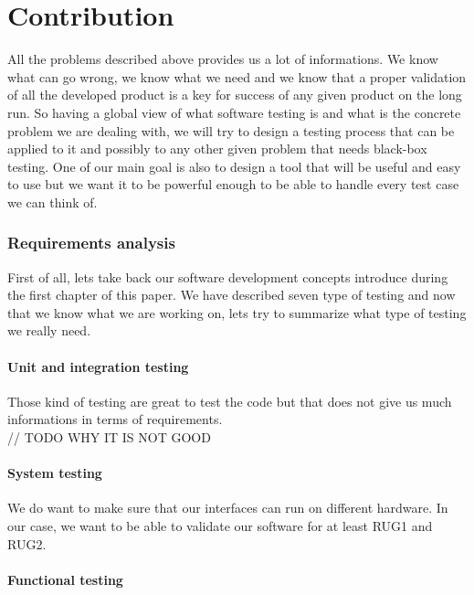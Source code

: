 \documentclass[12pt]{article}
\theoremstyle{definition}
\theoremstyle{definition}
\begin{document}
\clearpage
\part{Contribution}

All the problems described above provides us a lot of informations. We know what can go wrong, we know what we need and we know that a proper validation of all the developed product is a key for success of any given product on the long run. So having a global view of what software testing is and what is the concrete problem we are dealing with, we will try to design a testing process that can be applied to it and possibly to any other given problem that needs black-box testing. One of our main goal is also to design a tool that will be useful and easy to use but we want it to be powerful enough to be able to handle every test case we can think of.\\

\clearpage
\section{Requirements analysis}

First of all, lets take back our software development concepts introduce during the first chapter of this paper. We have described seven type of testing and now that we know what we are working on, lets try to summarize what type of testing we really need.\\

\subsection{Unit and integration testing}

Those kind of testing are great to test the code but that does not give us much informations in terms of requirements.\\ // TODO WHY IT IS NOT GOOD

\subsection{System testing}

We do want to make sure that our interfaces can run on different hardware. In our case, we want to be able to validate our software for at least RUG1 and RUG2.\\

\subsection{Functional testing}
\end{document}
